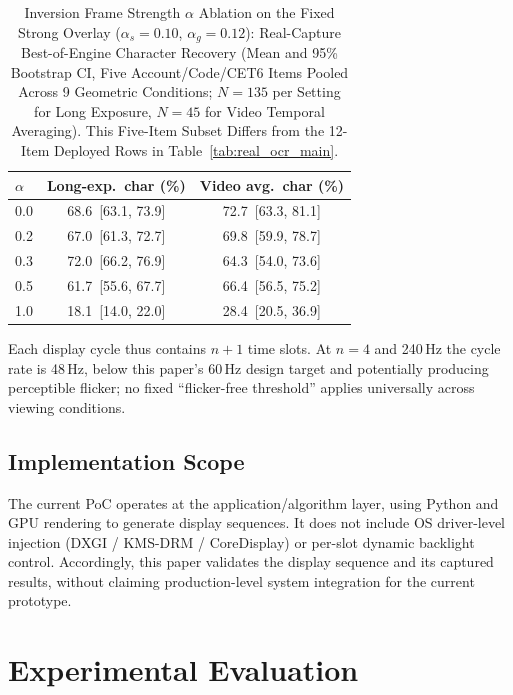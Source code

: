 \documentclass{ieeeaccess}
\begin{document}
\begin{table}[!t]
\caption{Inversion Frame Strength $\alpha$ Ablation on the Fixed Strong Overlay ($\alpha_s=0.10$, $\alpha_g=0.12$): Real-Capture Best-of-Engine Character Recovery (Mean and 95\% Bootstrap CI, Five Account/Code/CET6 Items Pooled Across 9 Geometric Conditions; $N=135$ per Setting for Long Exposure, $N=45$ for Video Temporal Averaging). This Five-Item Subset Differs from the 12-Item Deployed Rows in Table~\ref{tab:real_ocr_main}.}
\label{tab:inversion_ablation}
\centering
\small
\begin{tabular}{lcc}
\toprule
$\alpha$ & Long-exp.\ char (\%) & Video avg.\ char (\%) \\
\midrule
0.0 & 68.6~[63.1, 73.9] & 72.7~[63.3, 81.1] \\
0.2 & 67.0~[61.3, 72.7] & 69.8~[59.9, 78.7] \\
0.3 & 72.0~[66.2, 76.9] & 64.3~[54.0, 73.6] \\
0.5 & 61.7~[55.6, 67.7] & 66.4~[56.5, 75.2] \\
1.0 & 18.1~[14.0, 22.0] & 28.4~[20.5, 36.9] \\
\bottomrule
\end{tabular}
\end{table}

Each display cycle thus contains $n+1$ time slots. At $n=4$ and 240\,Hz the cycle rate is 48\,Hz, below this paper's 60\,Hz design target and potentially producing perceptible flicker; no fixed ``flicker-free threshold'' applies universally across viewing conditions.

\subsection{Implementation Scope}

The current PoC operates at the application/algorithm layer, using Python and GPU rendering to generate display sequences. It does not include OS driver-level injection (DXGI / KMS-DRM / CoreDisplay) or per-slot dynamic backlight control. Accordingly, this paper validates the display sequence and its captured results, without claiming production-level system integration for the current prototype.


\section{Experimental Evaluation}
\label{sec:evaluation}
\end{document}
